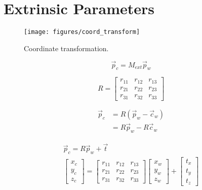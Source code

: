 \section{Extrinsic Parameters}
\begin{figure}[h!]
    \centering
    \texttt{[image: figures/coord\_transform]}
    \caption{Coordinate transformation.}
\end{figure}

\begin{equation}
    \vec{p}_c = M_{ext}\vec{p}_w
\end{equation}

\begin{equation}
    R =
    \begin{bmatrix}
        r_{11} & r_{12} & r_{13} \\
        r_{21} & r_{22} & r_{23} \\
        r_{31} & r_{32} & r_{33}
    \end{bmatrix}
\end{equation}


\begin{subequations} \label{eqn:main}
    \begin{alignat}{2}
        \vec{p}_c & = R(\vec{p}_w-\vec{c}_w) \label{subeqn:a} \\
                  & = R\vec{p}_w -R\vec{c}_w \label{subeqn:b}
    \end{alignat}
\end{subequations}


\begin{gather}
    \vec{p}_c = R\vec{p}_w + \vec{t} \\
    \begin{bmatrix}
        x_c \\ y_c \\ z_c
    \end{bmatrix}
    =
    \begin{bmatrix}
        r_{11} & r_{12} & r_{13} \\
        r_{21} & r_{22} & r_{23} \\
        r_{31} & r_{32} & r_{33}
    \end{bmatrix}
    \begin{bmatrix}
        x_w \\ y_w \\ z_w
    \end{bmatrix}
    +
    \begin{bmatrix}
        t_x \\ t_y \\ t_z
    \end{bmatrix}
\end{gather}


